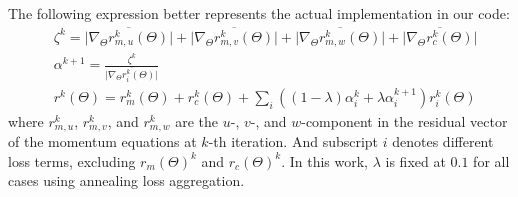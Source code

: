 The following expression better represents the actual implementation in our code:
\begin{equation}\label{eq:annealing-in-this-work}
    \begin{aligned}
        &\zeta^k =
            \overline{\lvert\nabla_\Theta r_{m,u}^k(\Theta)\rvert} +
            \overline{\lvert\nabla_\Theta r_{m,v}^k(\Theta)\rvert} +
            \overline{\lvert\nabla_\Theta r_{m,w}^k(\Theta)\rvert} +
            \overline{\lvert\nabla_\Theta r_{c}^k(\Theta)\rvert} \\
        &\alpha^{k+1} = 
            \frac{\zeta^k}{\overline{\lvert\nabla_\Theta r_i^k(\Theta)\rvert}} \\
        &r^k(\Theta) = r_m^k(\Theta) + r_c^k(\Theta) + 
            \sum\limits_{i} \left(\left(1-\lambda\right)\alpha_i^k + \lambda\alpha_i^{k+1}\right) r_i^k(\Theta)
    \end{aligned}
\end{equation}
where $r_{m,u}^k$, $r_{m,v}^k$, and $r_{m,w}^k$ are the $u$-, $v$-, and $w$-component in the residual vector of the momentum equations at $k$-th iteration.
And subscript $i$ denotes different loss terms, excluding $r_m(\Theta)^k$ and $r_c(\Theta)^k$.
In this work, $\lambda$ is fixed at $0.1$ for all cases using annealing loss aggregation.

